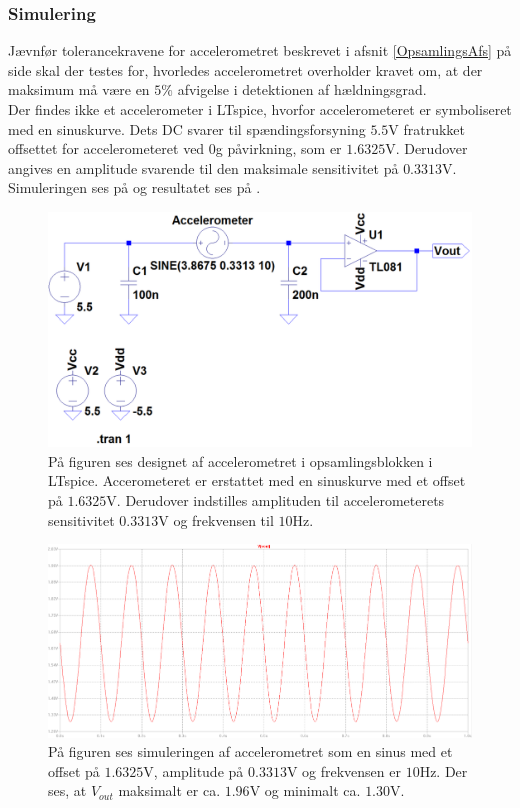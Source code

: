 \subsubsection{Simulering}
Jævnfør tolerancekravene for accelerometret beskrevet i afsnit \ref{OpsamlingsAfs} på side \pageref{OpsamlingsAfs} skal der testes for, hvorledes accelerometret overholder kravet om, at der maksimum må være en $5\%$ afvigelse i detektionen af hældningsgrad. \\
Der findes ikke et accelerometer i LTspice, hvorfor accelerometeret er symboliseret med en sinuskurve. Dets DC svarer til spændingsforsyning $5.5$V fratrukket offsettet for accelerometeret ved $0$g påvirkning, som er $1.6325$V. Derudover angives en amplitude svarende til den maksimale sensitivitet på $0.3313$V. Simuleringen ses på  og resultatet ses på .
\begin{figure}[H]
	\centering
	\includegraphics[scale=.4]{figures/cProblemloesning/Acc_Simulering1.PNG}
	\caption{På figuren ses designet af accelerometret i opsamlingsblokken i LTspice. Accerometeret er erstattet med en sinuskurve med et offset på $1.6325$V. Derudover indstilles amplituden til accelerometerets sensitivitet $0.3313$V og frekvensen til $10$Hz.}
	\label{fig:acc_simulering}
\end{figure}
\begin{figure}[H]
	\centering
	\includegraphics[scale=.35]{figures/cProblemloesning/Acc_Simulering2.PNG}
	\caption{På figuren ses simuleringen af accelerometret som en sinus med et offset på $1.6325$V, amplitude på $0.3313$V og frekvensen er $10$Hz. Der ses, at $V_{out}$ maksimalt er ca. $1.96$V og minimalt ca. $1.30$V.}
	\label{fig:acc_simulering_resultat}
\end{figure}

